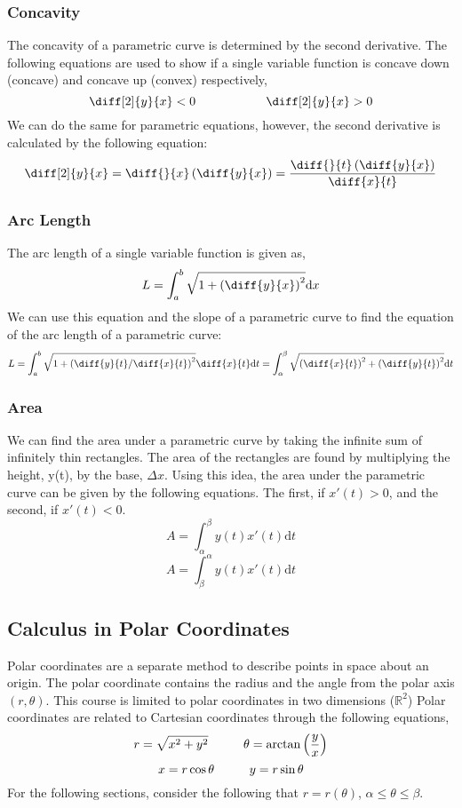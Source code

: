\documentclass{article}
\begin{document}
\subsubsection{Concavity}
The concavity of a parametric curve is determined by the second derivative. The following equations are used to show if 
a single variable function is concave down (concave) and concave up (convex) respectively,
$$\diff[2]{y}{x} < 0 \hspace{2 cm} \diff[2]{y}{x} > 0$$
We can do the same for parametric equations, however, the second derivative is calculated by the following equation:
$$\diff[2]{y}{x}=\diff{}{x}\left(\diff{y}{x}\right)=\frac{\diff{}{t}\left(\diff{y}{x}\right)}{\diff{x}{t}}$$

\subsubsection{Arc Length}
The arc length of a single variable function is given as,
$$L=\int_a^b{\sqrt{1+\left(\diff{y}{x}\right)^2}}\text{d}x$$
We can use this equation and the slope of a parametric curve to find the equation of the arc length of a parametric curve:
$$L = \int_a^b{\sqrt{1+\left( \diff{y}{t} \middle/ \diff{x}{t} \right)^2}}\diff{x}{t}\text{d}t = 
\int_{\alpha}^{\beta}\sqrt{\left(\diff{x}{t}\right)^2+\left(\diff{y}{t}\right)^2}\text{d}t$$

\subsubsection{Area}
We can find the area under a parametric curve by taking the infinite sum of infinitely thin rectangles. The area of the rectangles are found by multiplying the height, y(t), by the base, $\Delta{x}$. Using this idea, the area under the parametric curve can be given by the following equations. The first, if $x'(t) > 0$, and the second, if $x'(t) < 0$.
$$A = \int_{\alpha}^{\beta}{y(t)x'(t)}\text{d}t$$
$$A = \int_{\beta}^{\alpha}{y(t)x'(t)}\text{d}t$$ 


\subsection{Calculus in Polar Coordinates}
Polar coordinates are a separate method to describe points in space about an origin. The polar coordinate contains the radius and the angle from the polar axis $(r,\theta)$. This course is limited to polar coordinates in two dimensions ($\mathbb{R}^2$) Polar coordinates are related to Cartesian coordinates through the following equations, 
$$r = \sqrt{x^2+y^2} \hspace{1 cm} \theta = \arctan\left({\frac{y}{x}}\right)$$
$$x = r\cos{\theta} \hspace{1 cm} y = r\sin{\theta}$$
For the following sections, consider the following that $r = r(\theta)$, $\alpha \leq \theta \leq \beta$.
\end{document}
